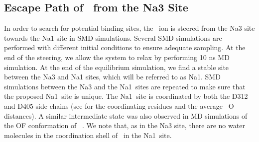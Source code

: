 \subsection{Escape Path of \Na\ from the Na3 Site}
In order to search for potential binding sites, the \Na\ ion is steered from the Na3 site towards 
the Na1 site in SMD simulations. Several SMD simulations are performed with different initial 
conditions to ensure adequate sampling. At the end of the steering, we allow the system to relax 
by performing 10 ns MD simulation. At the end of the equilibrium simulation, we find a stable 
site between the Na3 and Na1 sites, which will be referred to as Na1\prim. SMD simulations between the 
Na3 and the Na1\prim\ sites are repeated to make sure that the proposed Na1\prim\ site is unique. 
The Na1\prim\ site is coordinated by both the D312 and D405 side chains (see  
for the coordinating residues and the average \Na--O distances). A similar intermediate state was 
also observed in MD simulations of the OF conformation of \GltPh{}~\cite{Huang2010}. We note that, 
as in the Na3 site, there are no water molecules in the coordination shell of \Na\ in the Na1\prim\ 
site. 


